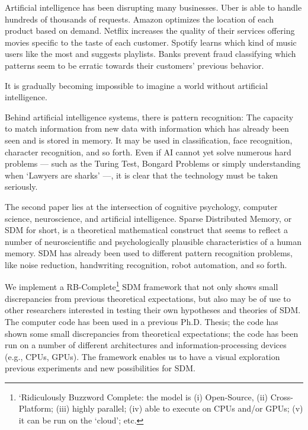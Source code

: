 Artificial intelligence has been disrupting many businesses. Uber is able to handle hundreds of thousands of requests. Amazon optimizes the location of each product based on demand. Netflix increases the quality of their services offering movies specific to the taste of each customer. Spotify learns which kind of music users like the most and suggests playlists. Banks prevent fraud classifying which patterns seem to be erratic towards their customers' previous behavior.

It is gradually becoming impossible to imagine a world without artificial intelligence.

Behind artificial intelligence systems, there is pattern recognition: The capacity to match information from new data with information which has already been seen and is stored in memory. It may be used in classification, face recognition, character recognition, and so forth.  Even if AI cannot yet solve numerous hard problems --- such as the Turing Test, Bongard Problems or simply understanding when `Lawyers are sharks' \citep{french1990subcognition, french2000turing, linhares2000glimpse, french2001co} ---, it is clear that the technology must be taken seriously.

The second paper lies at the intersection of cognitive psychology, computer science, neuroscience, and artificial intelligence.  Sparse Distributed Memory, or SDM for short, is a theoretical mathematical construct that seems to reflect a number of neuroscientific and psychologically plausible characteristics of a human memory. SDM has already been used to different pattern recognition problems, like noise reduction, handwriting recognition, robot automation, and so forth.

We implement a RB-Complete\footnote{`Ridiculously Buzzword Complete: the model is (i) Open-Source, (ii) Cross-Platform; (iii) highly parallel; (iv) able to execute on CPUs and/or GPUs; (v) it can be run on the `cloud'; etc.} SDM framework that not only shows small discrepancies from previous theoretical expectations, but also may be of use to other researchers interested in testing their own hypotheses and theories of SDM. The computer code has been used in a previous Ph.D. Thesis; the code has shown some small discrepancies from theoretical expectations; the code has been run on a number of different architectures and information-processing devices (e.g., CPUs, GPUs).  The framework enables us to have a visual exploration previous experiments and new possibilities for SDM.

